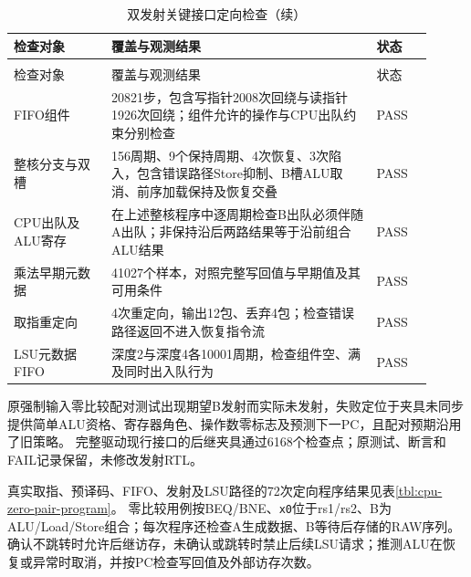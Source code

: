 \begin{reporttable}
\begin{longtable}{@{}p{0.21\linewidth}p{0.58\linewidth}p{0.12\linewidth}@{}}
\caption{双发射关键接口定向检查}\label{tbl:dual-contract-tests}\\
\toprule
检查对象 & 覆盖与观测结果 & 状态 \\
\midrule
\endfirsthead
\caption[]{双发射关键接口定向检查（续）}\\
\toprule
检查对象 & 覆盖与观测结果 & 状态 \\
\midrule
\endhead
\bottomrule
\endfoot
FIFO组件 & 20821步，包含写指针2008次回绕与读指针1926次回绕；组件允许的操作与CPU出队约束分别检查 & PASS \\
整核分支与双槽 & 156周期、9个保持周期、4次恢复、3次陷入，包含错误路径Store抑制、B槽ALU取消、前序加载保持及恢复交叠 & PASS \\
CPU出队及ALU寄存 & 在上述整核程序中逐周期检查B出队必须伴随A出队；非保持沿后两路结果等于沿前组合ALU结果 & PASS \\
乘法早期元数据 & 41027个样本，对照完整写回值与早期值及其可用条件 & PASS \\
取指重定向 & 4次重定向，输出12包、丢弃4包；检查错误路径返回不进入恢复指令流 & PASS \\
LSU元数据FIFO & 深度2与深度4各10001周期，检查组件空、满及同时出入队行为 & PASS \\
\end{longtable}
\end{reporttable}

原强制输入零比较配对测试出现期望B发射而实际未发射，失败定位于夹具未同步提供简单ALU资格、寄存器角色、操作数零标志及预测下一PC，且配对预期沿用了旧策略。
完整驱动现行接口的后继夹具通过6168个检查点；原测试、断言和FAIL记录保留，未修改发射RTL。

真实取指、预译码、FIFO、发射及LSU路径的72次定向程序结果见表\ref{tbl:cpu-zero-pair-program}。
零比较用例按BEQ/BNE、\texttt{x0}位于rs1/rs2、B为ALU/Load/Store组合；每次程序还检查A生成数据、B等待后存储的RAW序列。
确认不跳转时允许后继访存，未确认或跳转时禁止后续LSU请求；推测ALU在恢复或异常时取消，并按PC检查写回值及外部访存次数。


